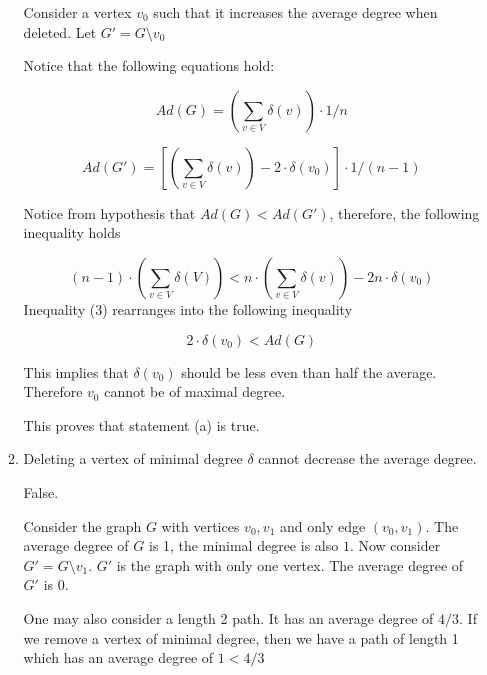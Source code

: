 \begin{enumerate}
\begin{enumerate}
            Consider a vertex $v_0$ such that it increases the average degree when deleted. Let $G' = G \setminus v_0$
            
            Notice that the following equations hold:
            
            \begin{equation}
             Ad(G) = \displaystyle\left(\sum\limits_{v\in V} \delta(v)\right) \cdot 1/n
            \end{equation}
            
            \begin{equation}
            Ad(G') = \displaystyle\left [\displaystyle\left(\sum\limits_{v\in V} \delta(v)\right)-2\cdot \delta(v_0) \right ] \cdot 1/(n-1)
            \end{equation}
            
            Notice from hypothesis that $Ad(G)< Ad(G')$, therefore, the following inequality holds
            
            \begin{equation}
                (n-1) \cdot \displaystyle \left ( \sum \limits_{v \in V}\delta(V) \right )< n \cdot \displaystyle \left ( \sum \limits_{v \in V} \delta(v) \right)-2n \cdot \delta(v_0)
            \end{equation}
            Inequality (3) rearranges into the following inequality
            
            \begin{equation}
                2 \cdot \delta(v_0) < Ad(G)
            \end{equation}
            
            This implies that $\delta(v_0)$ should be less even than half the average. Therefore $v_0$ cannot be of maximal degree.
            
            This proves that statement (a) is true.
            \item Deleting a vertex of minimal degree $\delta$ cannot decrease the average degree.
            
            False.
            
            Consider the graph $G$ with vertices $v_0,v_1$ and only edge $(v_0,v_1)$. The average degree of $G$ is 1, the minimal degree is also $1$. Now consider $G' = G \setminus v_1$. $G'$ is the graph with only one vertex. The average degree of $G'$ is $0$.
            
            One may also consider a length 2 path. It has an average degree of $4/3$. If we remove a vertex of minimal degree, then we have a path of length 1 which has an average degree of $1< 4/3$
        \end{enumerate}
        

\end{enumerate}
